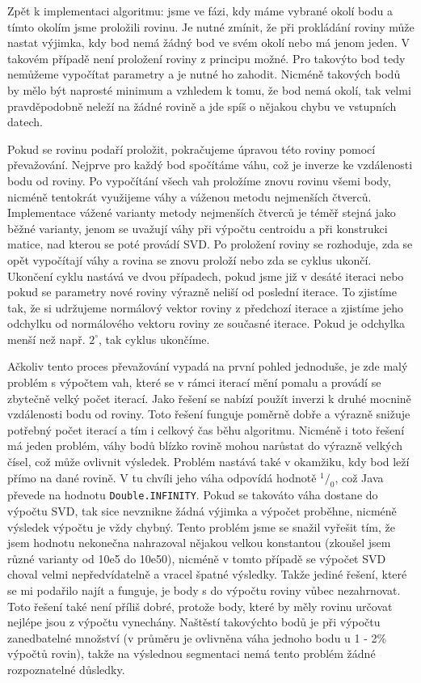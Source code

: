 \documentclass[11pt,twoside,a4paper]{book}
\begin{document}
Zpět k implementaci algoritmu: jsme ve fázi, kdy máme vybrané okolí bodu a tímto okolím jsme proložili rovinu. Je nutné zmínit, že při prokládání roviny může nastat výjimka, kdy bod nemá žádný bod ve svém okolí nebo má jenom jeden. V takovém případě není proložení roviny z principu možné. Pro takovýto bod tedy nemůžeme vypočítat parametry a je nutné ho zahodit. Nicméně takových bodů by mělo být naprosté minimum a vzhledem k tomu, že bod nemá okolí, tak velmi pravděpodobně neleží na žádné rovině a jde spíš o nějakou chybu ve vstupních datech. 

Pokud se rovinu podaří proložit, pokračujeme úpravou této roviny pomocí převažování. Nejprve pro každý bod spočítáme váhu, což je inverze ke vzdálenosti bodu od roviny. Po vypočítání všech vah proložíme znovu rovinu všemi body, nicméně tentokrát využijeme váhy a váženou metodu nejmenších čtverců. Implementace vážené varianty metody nejmenších čtverců je téměř stejná jako běžné varianty, jenom se uvažují váhy při výpočtu centroidu a při konstrukci matice, nad kterou se poté provádí SVD. Po proložení roviny se rozhoduje, zda se opět vypočítají váhy a rovina se znovu proloží nebo zda se cyklus ukončí. Ukončení cyklu nastává ve dvou případech, pokud jsme již v desáté iteraci nebo pokud se parametry nové roviny výrazně neliší od poslední iterace. To zjistíme tak, že si udržujeme normálový vektor roviny z předchozí iterace a zjistíme jeho odchylku od normálového vektoru roviny ze současné iterace. Pokud je odchylka menší než např. $2^\circ$, tak cyklus ukončíme.

Ačkoliv tento proces převažování vypadá na první pohled jednoduše, je zde malý problém s výpočtem vah, které se v rámci iterací mění pomalu a provádí se zbytečně velký počet iterací. Jako řešení se nabízí použít inverzi k druhé mocnině vzdálenosti bodu od roviny. Toto řešení funguje poměrně dobře a výrazně snižuje potřebný počet iterací a tím i celkový čas běhu algoritmu. Nicméně i toto řešení má jeden problém, váhy bodů blízko rovině mohou narůstat do výrazně velkých čísel, což může ovlivnit výsledek. Problém nastává také v okamžiku, kdy bod leží přímo na dané rovině. V tu chvíli jeho váha odpovídá hodnotě $^1/_0$, což Java převede na hodnotu \verb|Double.INFINITY|. Pokud se takováto váha dostane do výpočtu SVD, tak sice nevznikne žádná výjimka a výpočet proběhne, nicméně výsledek výpočtu je vždy chybný. Tento problém jsme se snažil vyřešit tím, že jsem hodnotu nekonečna nahrazoval nějakou velkou konstantou (zkoušel jsem různé varianty od 10e5 do 10e50), nicméně v tomto případě se výpočet SVD choval velmi nepředvídatelně a vracel špatné výsledky. Takže jediné řešení, které se mi podařilo najít a funguje, je body s  do výpočtu roviny vůbec nezahrnovat. Toto řešení také není příliš dobré, protože body, které by měly rovinu určovat nejlépe jsou z výpočtu vynechány. Naštěstí takovýchto bodů je při výpočtu zanedbatelné množství (v průměru je ovlivněna váha jednoho bodu u 1 - 2\% výpočtů rovin), takže na výslednou segmentaci nemá tento problém žádné rozpoznatelné důsledky.
\end{document}
